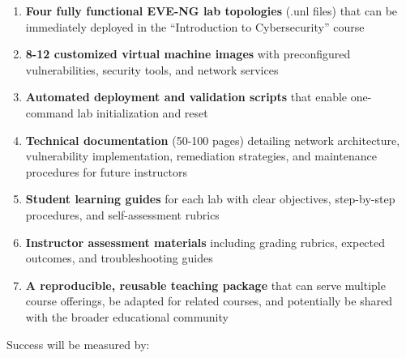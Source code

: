 \begin{enumerate}
    \item \textbf{Four fully functional EVE-NG lab topologies} (.unl files) that 
          can be immediately deployed in the ``Introduction to Cybersecurity'' course
    
    \item \textbf{8-12 customized virtual machine images} with preconfigured 
          vulnerabilities, security tools, and network services
    
    \item \textbf{Automated deployment and validation scripts} that enable 
          one-command lab initialization and reset
    
    \item \textbf{Technical documentation} (50-100 pages) detailing network 
          architecture, vulnerability implementation, remediation strategies, 
          and maintenance procedures for future instructors
    
    \item \textbf{Student learning guides} for each lab with clear objectives, 
          step-by-step procedures, and self-assessment rubrics
    
    \item \textbf{Instructor assessment materials} including grading rubrics, 
          expected outcomes, and troubleshooting guides
    
    \item \textbf{A reproducible, reusable teaching package} that can serve 
          multiple course offerings, be adapted for related courses, and 
          potentially be shared with the broader educational community
\end{enumerate}

Success will be measured by:

